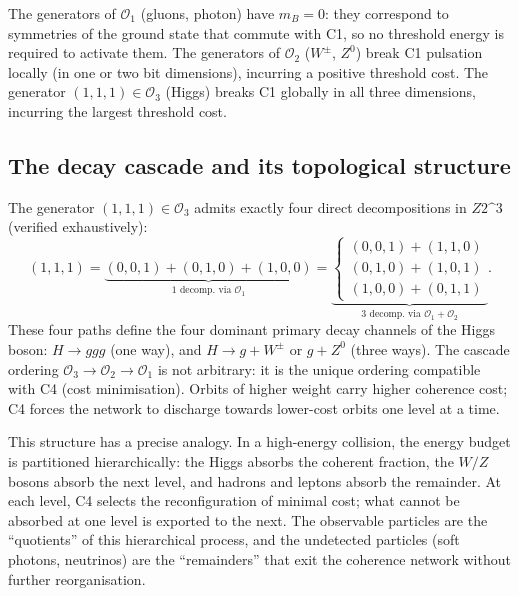\documentclass[12pt,a4paper]{article}
\theoremstyle{remark}
\newcommand{\Ztwo}{\mathbb{Z}_{2}^{3}}
\def\Ztwo{Z2\^{}3}%
\begin{document}
The generators of $\mathcal{O}_{1}$ (gluons, photon) have $m_{B}=0$: they
correspond to symmetries of the ground state that commute with C1, so no
threshold energy is required to activate them. The generators of
$\mathcal{O}_{2}$ ($W^{\pm}$, $Z^{0}$) break C1 pulsation locally (in one
or two bit dimensions), incurring a positive threshold cost. The generator
$(1,1,1)\in\mathcal{O}_{3}$ (Higgs) breaks C1 globally in all three
dimensions, incurring the largest threshold cost.

\subsection{The decay cascade and its topological structure}

The generator $(1,1,1)\in\mathcal{O}_{3}$ admits exactly four direct
decompositions in $\Ztwo$ (verified exhaustively):
\begin{equation}\label{eq:decomp}
(1,1,1) = \underbrace{(0,0,1)+(0,1,0)+(1,0,0)}_{\text{1 decomp.\ via }\mathcal{O}_{1}}
= \underbrace{\begin{cases}
(0,0,1)+(1,1,0)\\
(0,1,0)+(1,0,1)\\
(1,0,0)+(0,1,1)
\end{cases}}_{\text{3 decomp.\ via }\mathcal{O}_{1}+\mathcal{O}_{2}}.
\end{equation}
These four paths define the four dominant primary decay channels of the Higgs
boson: $H\to ggg$ (one way), and $H\to g+W^{\pm}$ or $g+Z^{0}$ (three ways).
The cascade ordering $\mathcal{O}_{3}\to\mathcal{O}_{2}\to\mathcal{O}_{1}$
is not arbitrary: it is the unique ordering compatible with C4 (cost
minimisation). Orbits of higher weight carry higher coherence cost; C4 forces
the network to discharge towards lower-cost orbits one level at a time.

This structure has a precise analogy. In a high-energy collision, the energy
budget is partitioned hierarchically: the Higgs absorbs the coherent fraction,
the $W/Z$ bosons absorb the next level, and hadrons and leptons absorb the
remainder. At each level, C4 selects the reconfiguration of minimal cost; what
cannot be absorbed at one level is exported to the next. The observable
particles are the ``quotients'' of this hierarchical process, and the
undetected particles (soft photons, neutrinos) are the ``remainders'' that
exit the coherence network without further reorganisation.
\end{document}
